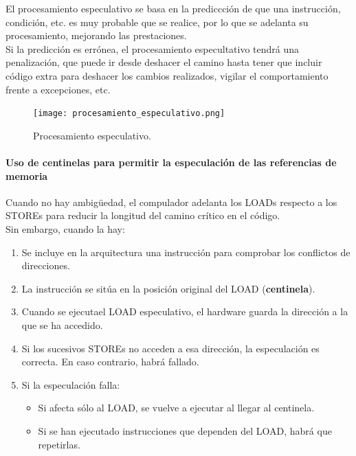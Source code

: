 \documentclass[12pt,spanish]{article}
\begin{document}
El procesamiento especulativo se basa en la prediccción de que una instrucción, condición, etc. es muy probable que se realice, por lo que se adelanta su procesamiento, mejorando las prestaciones.\\

Si la predicción es errónea, el procesamiento especultativo tendrá una penalización, que puede ir desde deshacer el camino hasta tener que incluir código extra para deshacer los cambios realizados, vigilar el comportamiento frente a excepciones, etc.\\

\begin{figure}[H]
\centering
\texttt{[image: procesamiento\_especulativo.png]}
\caption{Procesamiento especulativo.}
\end{figure}

\paragraph{Uso de centinelas para permitir la especulación de las referencias de memoria\\}

Cuando no hay ambigüedad, el compulador adelanta los LOADs respecto a los STOREs para reducir la longitud del camino crítico en el código.\\

Sin embargo, cuando la hay:

\begin{enumerate}
	\item Se incluye en la arquitectura una instrucción para comprobar los conflictos de direcciones.
	\item La instrucción se sitúa en la posición original del LOAD (\textbf{centinela}).
	\item Cuando se ejecutael LOAD especulativo, el hardware guarda la dirección a la que se ha accedido.
	\item Si los sucesivos STOREs no acceden a esa dirección, la especulación es correcta. En caso contrario, habrá fallado.
	\item Si la especulación falla:
	\begin{itemize}
		\item Si afecta sólo al LOAD, se vuelve a ejecutar al llegar al centinela.
		\item Si se han ejecutado instrucciones que dependen del LOAD, habrá que repetirlas.
	\end{itemize}
\end{enumerate}
\end{document}
